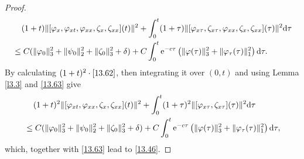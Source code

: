 \documentclass[11pt]{article}
\theoremstyle{plain}
\numberwithin{equation}{section}
\begin{document}
\begin{proof}
\begin{align}
			&\;\;\;\;(1+t)\|[\varphi_x,\varphi_{xt},\varphi_{xx},\zeta_x,\zeta_{xx}](t)\|^2+\int_{0}^{t}(1+\tau)\|[\varphi_{x\tau},\zeta_{x\tau},\varphi_{xx},\zeta_x,\zeta_{xx}](\tau)\|^2{\rm d}\tau\notag\\
			&\leq C(\|\varphi_0\|_3^2+\|\psi_0\|_2^2+\|\zeta_0\|_3^2+\delta)+C\int_{0}^{t}{\rm e}^{-c\tau}\left(\|\varphi(\tau)\|_3^2+\|\varphi_{\tau}(\tau)\|_1^2\right){\rm d}\tau.
		\end{align}
	By calculating $(1 + t)^2 \cdot\eqref{13.62}$, then integrating it over $(0, t)$ and using Lemma \ref{l3.3} and \eqref{13.63} give
	\begin{align}\label{13.64}
			&\;\;\;\;(1+t)^2\|[\varphi_{xt},\varphi_{xx},\zeta_x,\zeta_{xx}](t)\|^2+\int_{0}^{t}(1+\tau)^2\|[\varphi_{x\tau},\zeta_{x\tau}](\tau)\|^2{\rm d}\tau\notag\\
			&\leq C(\|\varphi_0\|_3^2+\|\psi_0\|_2^2+\|\zeta_0\|_3^2+\delta)+C\int_{0}^{t}{\rm e}^{-c\tau}\left(\|\varphi(\tau)\|_3^2+\|\varphi_{\tau}(\tau)\|_1^2\right){\rm d}\tau,
		\end{align}
		which, together with \eqref{13.63} lead to \eqref{13.46}.	
	\end{proof}
\end{document}

